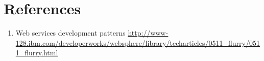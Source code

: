 \section{References}
\begin{enumerate}
 \item{Web services development patterns
 \url{http://www-128.ibm.com/developerworks/websphere/library/techarticles/0511_flurry/0511_flurry.html}}
\end{enumerate}



